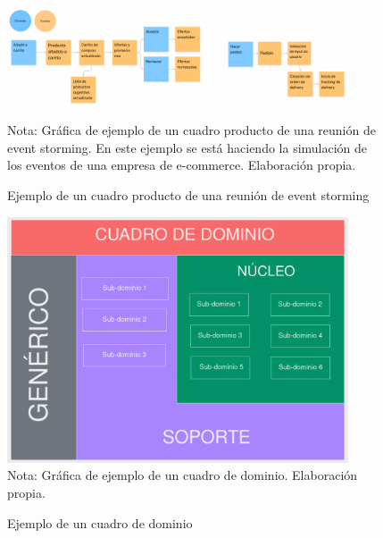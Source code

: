   \begin{figure}[H]
    \caption{Ejemplo de un cuadro producto de una reunión de event storming}
    \begin{center}
    \includegraphics[width=0.90\textwidth]{src/assets/metodologia/event_storming}
    \label{fig:event_storming}
    \end{center}
    Nota: Gráfica de ejemplo de un cuadro producto de una reunión de event storming.
    En este ejemplo se está haciendo la simulación de los eventos de una empresa de e-commerce.
    Elaboración propia.
  \end{figure}

\vspace{1em}

  \begin{figure}[H]
    \caption{Ejemplo de un cuadro de dominio}
    \centering
    \includegraphics[width=0.90\textwidth]{src/assets/metodologia/cuadro_dominio}
    \label{fig:cuadro_dominio}
    \\
    Nota: Gráfica de ejemplo de un cuadro de dominio. Elaboración propia.
  \end{figure}


